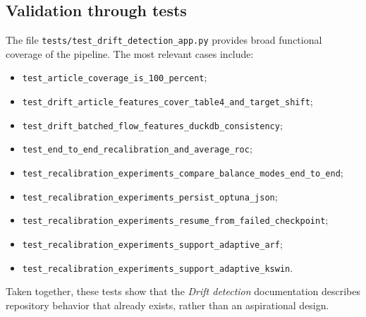 \subsection{Validation through tests}
The file \texttt{tests/test\_drift\_detection\_app.py} provides broad functional coverage of the pipeline. The most relevant cases include:
\begin{itemize}[leftmargin=*]
  \item \texttt{test\_article\_coverage\_is\_100\_percent};
  \item \texttt{test\_drift\_article\_features\_cover\_table4\_and\_target\_shift};
  \item \texttt{test\_drift\_batched\_flow\_features\_duckdb\_consistency};
  \item \texttt{test\_end\_to\_end\_recalibration\_and\_average\_roc};
  \item \texttt{test\_recalibration\_experiments\_compare\_balance\_modes\_end\_to\_end};
  \item \texttt{test\_recalibration\_experiments\_persist\_optuna\_json};
  \item \texttt{test\_recalibration\_experiments\_resume\_from\_failed\_checkpoint};
  \item \texttt{test\_recalibration\_experiments\_support\_adaptive\_arf};
  \item \texttt{test\_recalibration\_experiments\_support\_adaptive\_kswin}.
\end{itemize}

Taken together, these tests show that the \textit{Drift detection} documentation describes repository behavior that already exists, rather than an aspirational design.
